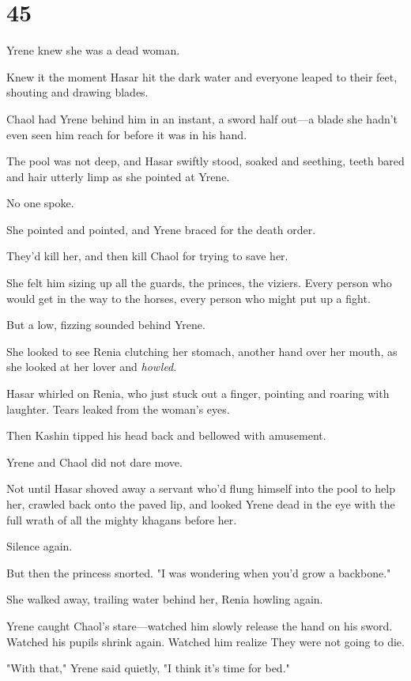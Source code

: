 
\chapter{45}

Yrene knew she was a dead woman.

Knew it the moment Hasar hit the dark water and everyone leaped to their feet, shouting and drawing blades.

Chaol had Yrene behind him in an instant, a sword half out---a blade she hadn't even seen him reach for before it was in his hand.

The pool was not deep, and Hasar swiftly stood, soaked and seething, teeth bared and hair utterly limp as she pointed at Yrene.

No one spoke.

She pointed and pointed, and Yrene braced for the death order.

They'd kill her, and then kill Chaol for trying to save her.

She felt him sizing up all the guards, the princes, the viziers. Every person who would get in the way to the horses, every person who might put up a fight.

But a low, fizzing sounded behind Yrene.

She looked to see Renia clutching her stomach, another hand over her mouth, as she looked at her lover and \emph{howled}.

Hasar whirled on Renia, who just stuck out a finger, pointing and roaring with laughter. Tears leaked from the woman's eyes.

Then Kashin tipped his head back and bellowed with amusement.

Yrene and Chaol did not dare move.

Not until Hasar shoved away a servant who'd flung himself into the pool to help her, crawled back onto the paved lip, and looked Yrene dead in the eye with the full wrath of all the mighty khagans before her.

Silence again.

But then the princess snorted. "I was wondering when you'd grow a backbone."

She walked away, trailing water behind her, Renia howling again.

Yrene caught Chaol's stare---watched him slowly release the hand on his sword. Watched his pupils shrink again. Watched him realize 
They were not going to die.

"With that," Yrene said quietly, "I think it's time for bed."

